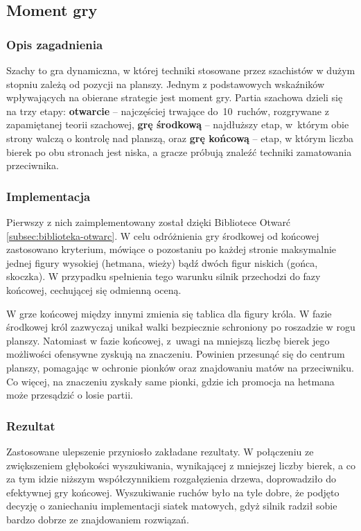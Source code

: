 \subsection{Moment gry}
\label{subsec:moment-gry}

\subsubsection{Opis zagadnienia}
Szachy to gra dynamiczna, w której techniki stosowane przez szachistów w dużym stopniu zależą od pozycji na planszy.
Jednym z podstawowych wskaźników wpływających na obierane strategie jest moment gry.
Partia szachowa dzieli się na trzy etapy: \textbf{otwarcie} – najczęściej trwające do~10~ruchów, rozgrywane z zapamiętanej teorii szachowej, \textbf{grę środkową} – najdłuższy etap, w~którym obie strony walczą o kontrolę nad planszą, oraz \textbf{grę końcową} – etap, w którym liczba bierek po obu stronach jest niska, a gracze próbują znaleźć techniki zamatowania przeciwnika.

\subsubsection{Implementacja}
Pierwszy z nich zaimplementowany został dzięki Bibliotece Otwarć \ref{subsec:biblioteka-otwarc}.
W celu odróżnienia gry środkowej od końcowej zastosowano kryterium, mówiące o pozostaniu po każdej stronie maksymalnie jednej figury wysokiej (hetmana, wieży) bądź dwóch figur niskich (gońca, skoczka).
W przypadku spełnienia tego warunku silnik przechodzi do fazy końcowej, cechującej się odmienną oceną.

W grze końcowej między innymi zmienia się tablica dla figury króla.
W fazie środkowej król zazwyczaj unikał walki bezpiecznie schroniony po roszadzie w rogu planszy.
Natomiast w fazie końcowej, z~uwagi na mniejszą liczbę bierek jego możliwości ofensywne zyskują na znaczeniu.
Powinien przesunąć się do centrum planszy, pomagając w ochronie pionków oraz znajdowaniu matów na przeciwniku.
Co więcej, na znaczeniu zyskały same pionki, gdzie ich promocja na hetmana może przesądzić o losie partii.

\subsubsection{Rezultat}
Zastosowane ulepszenie przyniosło zakładane rezultaty.
W połączeniu ze zwiększeniem głębokości wyszukiwania, wynikającej z mniejszej liczby bierek, a co za tym idzie niższym współczynnikiem rozgałęzienia drzewa, doprowadziło do efektywnej gry końcowej.
Wyszukiwanie ruchów było na tyle dobre, że podjęto decyzję o zaniechaniu implementacji siatek matowych, gdyż silnik radził sobie bardzo dobrze ze znajdowaniem rozwiązań.